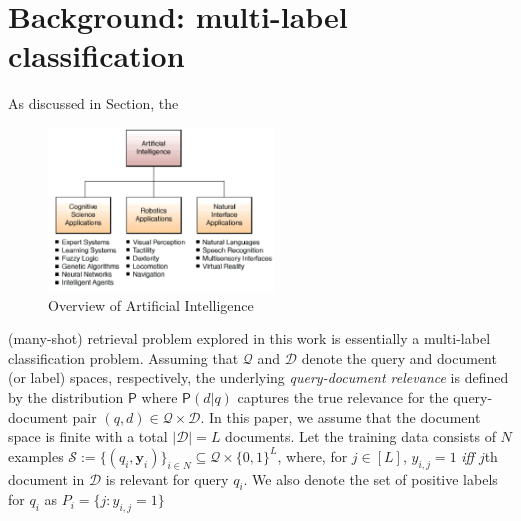 \documentclass{article}
\begin{document}
\vspace{-8pt}
\section{Background: multi-label classification}
\label{sec:bg}
\vspace{-5pt}

As discussed in Section, the  
\begin{figure}[H]
    \centering
    \includegraphics[width=6cm]{ai-overview.png}
    \caption{Overview of Artificial Intelligence}
    \label{fig:ai-overview}
\end{figure}

(many-shot) retrieval problem %
explored in this work is essentially a multi-label classification problem. Assuming that $\mathscr{Q}$ and $\mathscr{D}$ denote the query and document (or label) spaces, respectively, the underlying \textit{query-document relevance} is defined by the distribution $\mathsf{P}$ where $\mathsf{P}(d|q)$ captures the true relevance for the query-document pair $(q, d) \in \mathscr{Q} \times \mathscr{D}$. In this paper, we assume that the document space is finite with a total $|\mathscr{D}| =  L$ documents. Let the training data consists of $N$ examples $\mathcal{S} := \{(q_i, \mathbf{y}_i)\}_{i \in {N}} \subseteq \mathscr{Q} \times \{0, 1\}^{L}$, where, for $j \in [L]$, $y_{i, j} = 1$ \textit{iff} $j$th document in $\mathscr{D}$ is relevant for query $q_i$. We also denote the set of positive labels for $q_i$ as $P_i = \{j: y_{i,j}=1\}$ %
\end{document}
